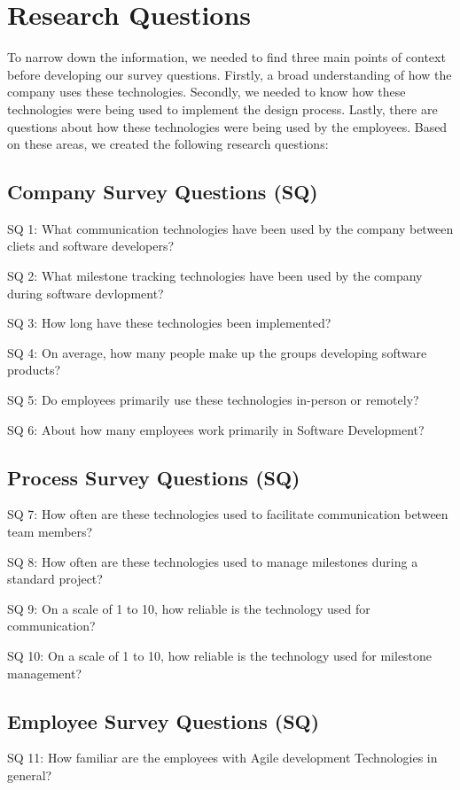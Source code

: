 \documentclass[conference]{IEEEtran}
\begin{document}
\section{Research Questions}
To narrow down the information, we needed to find three main points of context before developing our survey questions. Firstly, a broad understanding of how the company uses these technologies.  Secondly, we needed to know how these technologies were being used to implement the design process. Lastly, there are questions about how these technologies were being used by the employees. Based on these areas, we created the following research questions: 

\subsection*{Company Survey Questions (SQ) }
SQ 1: What communication technologies have been used by the company between cliets and software developers? 

SQ 2: What milestone tracking technologies have been used by the company during software devlopment? 

SQ 3: How long have these technologies been implemented? 

SQ 4: On average, how many people make up the groups developing software products?

SQ 5: Do employees primarily use these technologies in-person or remotely? 

SQ 6: About how many employees work primarily in Software Development?

\subsection*{Process Survey Questions (SQ)  }
SQ 7: How often are these technologies used to facilitate communication between team members? 

SQ 8: How often are these technologies used to manage milestones during a standard project? 

SQ 9: On a scale of 1 to 10, how reliable is the technology used for communication? 

SQ 10: On a scale of 1 to 10, how reliable is the technology used for milestone management? 


\subsection*{Employee Survey Questions (SQ)  }
SQ 11: How familiar are the employees with Agile development Technologies in general? 
\end{document}
